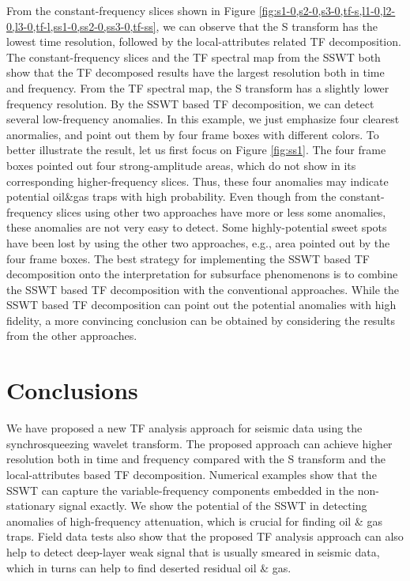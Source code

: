 From the constant-frequency slices shown in Figure \ref{fig:s1-0,s2-0,s3-0,tf-s,l1-0,l2-0,l3-0,tf-l,ss1-0,ss2-0,ss3-0,tf-ss}, we can observe that the S transform has the lowest time resolution, followed by the local-attributes related TF decomposition. The constant-frequency slices and the TF spectral map from the SSWT both show that the TF decomposed results have the largest resolution both in time and frequency. From the TF spectral map, the S transform has a slightly lower frequency resolution. By the SSWT based TF decomposition, we can detect several low-frequency anomalies. In this example, we just emphasize four clearest anormalies, and point out them by four frame boxes with different colors. To better illustrate the result, let us first focus on Figure \ref{fig:ss1}. The four frame boxes pointed out four strong-amplitude areas, which do not show in its corresponding higher-frequency slices. Thus, these four anomalies may indicate potential oil\&gas traps with high probability. Even though from the constant-frequency slices using other two approaches have more or less some anomalies, these anomalies are not very easy to detect. Some highly-potential sweet spots have been lost by using the other two approaches, e.g., area pointed out by the four frame boxes. The best strategy for implementing the SSWT based TF decomposition onto the interpretation for subsurface phenomenons is to combine the SSWT based TF decomposition with the conventional approaches. While the SSWT based TF decomposition can point out the potential anomalies with high fidelity, a more convincing conclusion can be obtained by considering the results from the other approaches.

\section{Conclusions}
We have proposed a new TF analysis approach for seismic data using the synchrosqueezing wavelet transform. The proposed approach can achieve higher resolution both in time and frequency compared with the S transform and the local-attributes based TF decomposition. Numerical examples show that the SSWT can capture the variable-frequency components embedded in the non-stationary signal exactly. We show the potential of the SSWT %
in detecting anomalies of high-frequency attenuation, which is crucial for finding  oil \& gas traps. Field data  tests also show that the proposed TF analysis approach can also help to detect deep-layer weak signal that is usually smeared in seismic data, which in turns can help to find deserted residual oil \& gas.

